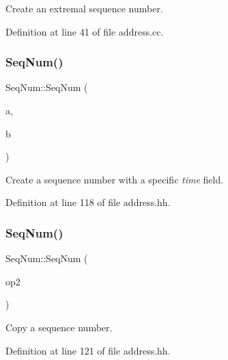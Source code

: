 Create an extremal sequence number. 



Definition at line 41 of file address.\+cc.

\mbox{\label{class_seq_num_a71be5a5e1b4161200046a9c6203abcb3}} 
\subsubsection{\texorpdfstring{SeqNum()}{SeqNum()}\hspace{0.1cm}{\footnotesize\ttfamily [3/4]}}
{\footnotesize\ttfamily Seq\+Num\+::\+Seq\+Num (\begin{DoxyParamCaption}\item[{const \mbox{\hyperlink{class_address}{Address}} \&}]{a,  }\item[{uintm}]{b }\end{DoxyParamCaption})\hspace{0.3cm}{\ttfamily [inline]}}



Create a sequence number with a specific {\itshape time} field. 



Definition at line 118 of file address.\+hh.

\mbox{\label{class_seq_num_a8ff8e92a93503828a8db088c291675bf}} 
\subsubsection{\texorpdfstring{SeqNum()}{SeqNum()}\hspace{0.1cm}{\footnotesize\ttfamily [4/4]}}
{\footnotesize\ttfamily Seq\+Num\+::\+Seq\+Num (\begin{DoxyParamCaption}\item[{const \mbox{\hyperlink{class_seq_num}{Seq\+Num}} \&}]{op2 }\end{DoxyParamCaption})\hspace{0.3cm}{\ttfamily [inline]}}



Copy a sequence number. 



Definition at line 121 of file address.\+hh.



